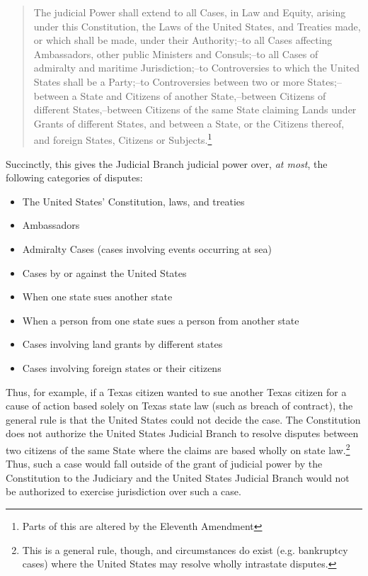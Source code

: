 \begin{quote}

The judicial Power shall extend to all Cases, in Law and Equity, arising under this Constitution, the Laws of the United States, and Treaties made, or which shall be made, under their Authority;--to all Cases affecting Ambassadors, other public Ministers and Consuls;--to all Cases of admiralty and maritime Jurisdiction;--to Controversies to which the United States shall be a Party;--to Controversies between two or more States;-- between a State and Citizens of another State,--between Citizens of different States,--between Citizens of the same State claiming Lands under Grants of different States, and between a State, or the Citizens thereof, and foreign States, Citizens or Subjects.\footnote{Parts of this are altered by the Eleventh Amendment}

\end{quote}

Succinctly, this gives the Judicial Branch judicial power over, \textit{at most}, the following categories of disputes:
\begin{itemize}
\item The United States' Constitution, laws, and treaties
\item Ambassadors
\item Admiralty Cases (cases involving events occurring at sea)
\item Cases by or against the United States
\item When one state sues another state
\item When a person from one state sues a person from another state
\item Cases involving land grants by different states
\item Cases involving foreign states or their citizens
\end{itemize}

Thus, for example, if a Texas citizen wanted to sue another Texas citizen for a cause of action based solely on Texas state law (such as breach of contract), the general rule is that the United States could not decide the case.  The Constitution does not authorize the United States Judicial Branch to resolve disputes between two citizens of the same State where the claims are based wholly on state law.\footnote{This is a general rule, though, and circumstances do exist (e.g. bankruptcy cases) where the United States may resolve wholly intrastate disputes.} Thus, such a case would fall outside of the grant of judicial power by the Constitution to the Judiciary and the United States Judicial Branch would not be authorized to exercise jurisdiction over such a case.

